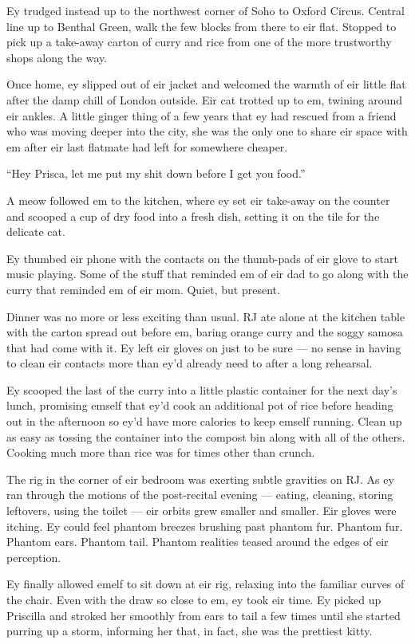 Ey trudged instead up to the northwest corner of Soho to Oxford Circus. Central line up to Benthal Green, walk the few blocks from there to eir flat. Stopped to pick up a take-away carton of curry and rice from one of the more trustworthy shops along the way.

Once home, ey slipped out of eir jacket and welcomed the warmth of eir little flat after the damp chill of London outside. Eir cat trotted up to em, twining around eir ankles. A little ginger thing of a few years that ey had rescued from a friend who was moving deeper into the city, she was the only one to share eir space with em after eir last flatmate had left for somewhere cheaper.

``Hey Prisca, let me put my shit down before I get you food.''

A meow followed em to the kitchen, where ey set eir take-away on the counter and scooped a cup of dry food into a fresh dish, setting it on the tile for the delicate cat.

Ey thumbed eir phone with the contacts on the thumb-pads of eir glove to start music playing. Some of the stuff that reminded em of eir dad to go along with the curry that reminded em of eir mom. Quiet, but present.

Dinner was no more or less exciting than usual. RJ ate alone at the kitchen table with the carton spread out before em, baring orange curry and the soggy samosa that had come with it. Ey left eir gloves on just to be sure --- no sense in having to clean eir contacts more than ey'd already need to after a long rehearsal.

Ey scooped the last of the curry into a little plastic container for the next day's lunch, promising emself that ey'd cook an additional pot of rice before heading out in the afternoon so ey'd have more calories to keep emself running. Clean up as easy as tossing the container into the compost bin along with all of the others. Cooking much more than rice was for times other than crunch.

The rig in the corner of eir bedroom was exerting subtle gravities on RJ. As ey ran through the motions of the post-recital evening --- eating, cleaning, storing leftovers, using the toilet --- eir orbits grew smaller and smaller. Eir gloves were itching. Ey could feel phantom breezes brushing past phantom fur. Phantom fur. Phantom ears. Phantom tail. Phantom realities teased around the edges of eir perception.

Ey finally allowed emelf to sit down at eir rig, relaxing into the familiar curves of the chair. Even with the draw so close to em, ey took eir time. Ey picked up Priscilla and stroked her smoothly from ears to tail a few times until she started purring up a storm, informing her that, in fact, she was the prettiest kitty.


